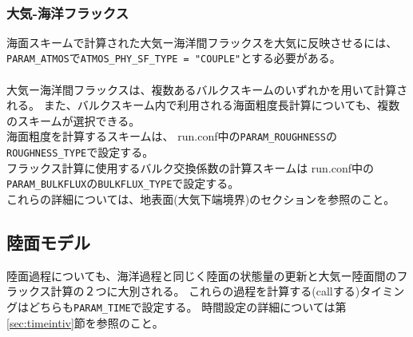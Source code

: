 \\

\subsubsection{大気-海洋フラックス}
海面スキームで計算された大気ー海洋間フラックスを大気に反映させるには、\verb|PARAM_ATMOS|で\verb|ATMOS_PHY_SF_TYPE = "COUPLE"|とする必要がある。\\

\\

大気ー海洋間フラックスは、複数あるバルクスキームのいずれかを用いて計算される。
また、バルクスキーム内で利用される海面粗度長計算についても、複数のスキームが選択できる。\\

海面粗度を計算するスキームは、
run.conf中の\verb|PARAM_ROUGHNESS|の\verb|ROUGHNESS_TYPE|で設定する。\\

フラックス計算に使用するバルク交換係数の計算スキームは
run.conf中の\verb|PARAM_BULKFLUX|の\verb|BULKFLUX_TYPE|で設定する。\\

これらの詳細については、地表面(大気下端境界)のセクションを参照のこと。



\subsection{陸面モデル} \label{sec:basic_ocean}
陸面過程についても、海洋過程と同じく陸面の状態量の更新と大気ー陸面間のフラックス計算の２つに大別される。
これらの過程を計算する(callする)タイミングはどちらも\verb|PARAM_TIME|で設定する。
時間設定の詳細については第\ref{sec:timeintiv}節を参照のこと。\\


